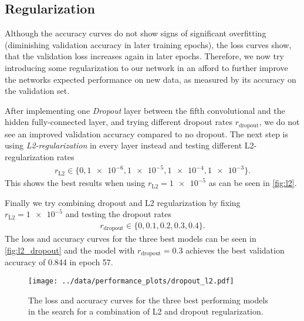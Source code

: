 \subsection{Regularization}
Although the accuracy curves do not show signs of significant overfitting (diminishing validation accuracy in later training epochs), the loss curves show, that the validation loss 
increases again in later epochs. 
Therefore, we now try introducing some regularization to our network in an afford to further improve the networks expected performance on new data, as measured by its accuracy on the validation set.

After implementing one \textit{Dropout} layer between the fifth convolutional and the hidden fully-connected layer, and trying different dropout rates $r_\text{dropout}$, we do not see an 
improved validation accuracy compared to no dropout.
The next step is using \textit{L2-regularization} in every layer instead and testing different L2-regularization rates
\begin{align}
    r_\text{L2} \in \{0, \num{1e-6}, \num{1e-5}, \num{1e-4}, \num{1e-3}\}.
\end{align}
This shows the best results when using $r_\text{L2} = \num{1e-5}$ as can be seen in \autoref{fig:l2}.

Finally we try combining dropout and L2 regularization by fixing $r_\text{L2} = \num{1e-5}$ and testing the dropout rates
\begin{align}
    r_\text{dropout} \in \{0, 0.1, 0.2, 0.3, 0.4\}.
\end{align}
The loss and accuracy curves for the three best models can be seen in \autoref{fig:l2_dropout} and the model with $r_\text{dropout} = 0.3$ achieves the best validation accuracy
of 0.844 in epoch 57.
\begin{figure}
    \centering
    \texttt{[image: ../data/performance\_plots/dropout\_l2.pdf]}
    \caption{The loss and accuracy curves for the three best performing models in the search for a combination of L2 and dropout regularization.}
    \label{fig:l2_dropout}
\end{figure}
